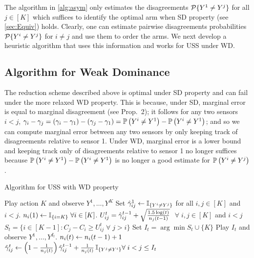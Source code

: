 The algorithm in \ref{alg:asym} only estimates the disagreements $\P\{Y^1 \neq Y^j\}$ for all $j \in [K]$ which suffices to identify the optimal arm when SD property (see \cref{sec:Equiv}) holds. Clearly, one can estimate pairwise disagreements probabilities $\P\{Y^i \neq Y^j\}$ for $i\neq j$ and use them to order the arms. We next develop a heuristic algorithm that uses this information and works for USS under WD. 

\subsection{Algorithm for Weak Dominance}
The reduction scheme described above is optimal under SD property and can fail under the more relaxed WD property. This is because, under SD, marginal error is equal to marginal disagreement (see Prop.~2); it follows for any two sensors $i < j$, $\gamma_i-\gamma_j = (\gamma_i-\gamma_1) - (\gamma_j-\gamma_1) = \Prob{Y^i\ne Y^1} - \Prob{Y^i\ne Y^1}$; and so we can compute marginal error between any two sensors by only keeping track of disagreements relative to sensor 1. Under WD, marginal error is a lower bound and keeping track only of disagreements relative to sensor 1 no longer suffices because $\Prob{Y^i\ne Y^1} - \Prob{Y^i\ne Y^1}$ is no longer a good estimate for $\Prob{Y^i\ne Y^j}$.
\begin{center}
\begin{minipage}{0.48\textwidth}
		\begin{algorithm}[H]
			\caption{Algorithm for USS with WD property} %
			\label{alg:UCB}
			\begin{algorithmic}[1]
				\STATE Play action $K$ and observe $Y^1,\dots,Y^K$
				\STATE Set $\hgamma_{ij}^1 \set \one{Y^i\ne Y^j}$ for all $i,j\in [K]$ and $i < j$.
				\STATE $n_i(1)\leftarrow \one{i=K} \; \forall i\in [K]$.
				\STATE $U_{ij}^t=\hgamma_{ij}^{t-1} + \sqrt{\frac{1.5\log(t)}{n_j(t-1)}}$  $\;\forall \; i,j \in [K]$ and $i<j$ \label{algo:UCB}
				\STATE $S_t=\{i \in [K-1]: C_j-C_i \geq U_{ij}^t \;\forall \;   j > i \}$ \label{algo:sort}
				\STATE Set $I_t= \arg \min S_t \cup \{K\} $
				\STATE Play $I_t$ and observe $Y^1,\dots,Y^{I_t}$.
				\STATE $n_i(t) \set n_i(t-1)+1$\\
				 \STATE $\hgamma_{ij}^t \set \left (1-\frac{1}{n_j(t)}\right )
				 \hgamma_{ij}^{t-1} + \frac{1}{n_j(t)} \,\one{Y^j\ne Y^i} \forall \; i<j \leq I_t$ \label{algo:Update}
				\ENDFOR
				\ENDFOR
			\end{algorithmic}
		\end{algorithm}
	\end{minipage}
\end{center}

